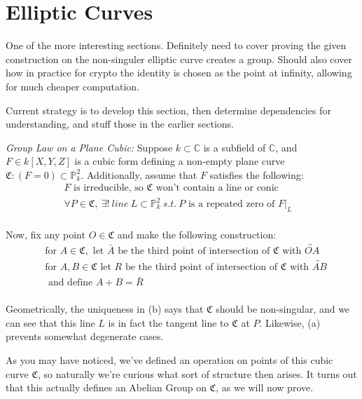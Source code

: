 \section{Elliptic Curves}

One of the more interesting sections. Definitely need to
cover proving the given construction on the non-singuler elliptic
curve creates a group. Should also cover how in practice for crypto
the identity is chosen as the point at infinity, allowing for 
much cheaper computation.

Current strategy is to develop this section, then determine
dependencies for understanding, and stuff those in the
earlier sections.

\hrulefill

\begin{mydef}
\label{def:ellipticgroup}
\emph{Group Law on a Plane Cubic:}
Suppose $k \subset \mathbb{C}$ is a subfield of $\mathbb{C}$,
and $F \in k[X,Y,Z]$ is a cubic form defining a non-empty plane
curve $\mathfrak{C}:(F=0) \subset \mathbb{P}^2_k$. Additionally, assume that
$F$ satisfies the following:
\begin{align*}
F \text{ is irreducible, so $\mathfrak{C}$ won't contain a line or conic}&\tag{a}\\
\forall P \in \mathfrak{C},~\exists!~line~L \subset \mathbb{P}^2_k~s.t.~ P
\text{ is a repeated zero of } F|_L& \tag{b}\\
\end{align*}

Now, fix any point $O \in \mathfrak{C}$ and make the following construction:
\begin{align*}
&\text{for } A \in \mathfrak{C}, \text{ let } \bar{A} \text{ be the third point of intersection of $\mathfrak{C}$ with $\overleftrightarrow{OA}$} \tag{i}\\
&\text{for } A, B \in \mathfrak{C} \text{ let } R \text{ be the third point of intersection of $\mathfrak{C}$ with $\overleftrightarrow{AB}$}\\
&\text{ and define $A+B = \bar{R}$}\tag{ii}\\
\end{align*}
\end{mydef}

Geometrically, the uniqueness in (b) says that $\mathfrak{C}$ should be non-singular,
and we can see that this line $L$ is in fact the tangent line to $\mathfrak{C}$ at $P$.
Likewise, (a) prevents somewhat degenerate cases.

As you may have noticed, we've defined an operation on points of this
cubic curve $\mathfrak{C}$, so naturally we're curious what sort of structure then
arises. It turns out that this actually defines an Abelian Group on $\mathfrak{C}$,
as we will now prove.

